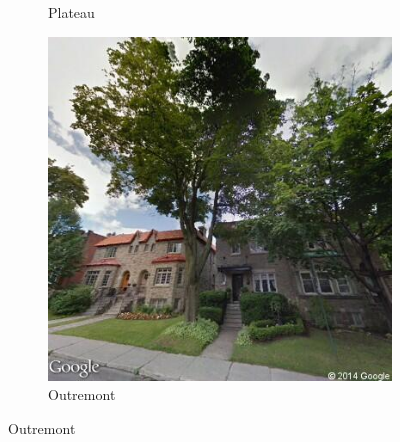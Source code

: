 \documentclass{acm_proc_article-sp}
\begin{document}
\begin{figure}[h!]
\begin{subfigure}[b]{0.3\linewidth}
		\caption{Plateau}
		\label{fig:plateau}
	\end{subfigure}
	\begin{subfigure}[b]{0.3\linewidth}
		\includegraphics[width=\linewidth]{outremont.png}
		\caption{Outremont}
		\label{fig:outremont}
	\end{subfigure}


\end{figure}
\end{document}
